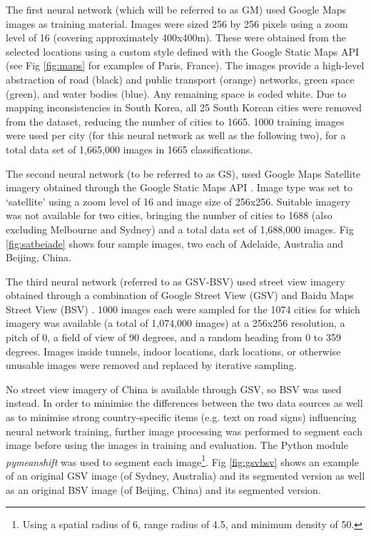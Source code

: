 \documentclass[10pt,letterpaper,hidelinks]{article}
\begin{document}
The first neural network (which will be referred to as GM) used Google Maps images as training material. Images were sized 256 by 256 pixels using a zoom level of 16 (covering approximately 400x400m). These were obtained from the selected locations using a custom style defined with the Google Static Maps API \cite{GoogleStatic2017} (see Fig \ref{fig:maps} for examples of Paris, France). The images provide a high-level abstraction of road (black) and public transport (orange) networks, green space (green), and water bodies (blue). Any remaining space is coded white. Due to mapping inconsistencies in South Korea, all 25 South Korean cities were removed from the dataset, reducing the number of cities to 1665. 1000 training images were used per city (for this neural network as well as the following two), for a total data set of 1,665,000 images in 1665 classifications. 

The second neural network (to be referred to as GS), used Google Maps Satellite imagery obtained through the Google Static Maps API \cite{GoogleStatic2017}. Image type was set to `satellite' using a zoom level of 16 and image size of 256x256. Suitable imagery was not available for two cities, bringing the number of cities to 1688 (also excluding Melbourne and Sydney) and a total data set of 1,688,000 images. Fig \ref{fig:satbeiade} shows four sample images, two each of Adelaide, Australia and Beijing, China. 

The third neural network (referred to as GSV-BSV) used street view imagery obtained through a combination of Google Street View (GSV) \cite{GoogleMaps2017b} and Baidu Maps Street View (BSV) \cite{Baidu2017}. 1000 images each were sampled for the 1074 cities for which imagery was available (a total of 1,074,000 images) at a 256x256 resolution, a pitch of 0, a field of view of 90 degrees, and a random heading from 0 to 359 degrees. Images inside tunnels, indoor locations, dark locations, or otherwise unusable images were removed and replaced by iterative sampling.

No street view imagery of China is available through GSV, so BSV was used instead.  In order to minimise the differences between the two data sources as well as to minimise strong country-specific items (e.g. text on road signs) influencing neural network training, further image processing was performed to segment each image before using the images in training and evaluation. The Python module \textit{pymeanshift} \cite{Pymeanshift2017} was used to segment each image\footnote{Using a spatial radius of 6, range radius of 4.5, and minimum density of 50.}. Fig \ref{fig:gsvbsv} shows an example of an original GSV image (of Sydney, Australia) and its segmented version as well as an original BSV image (of Beijing, China) and its segmented version.
\end{document}
